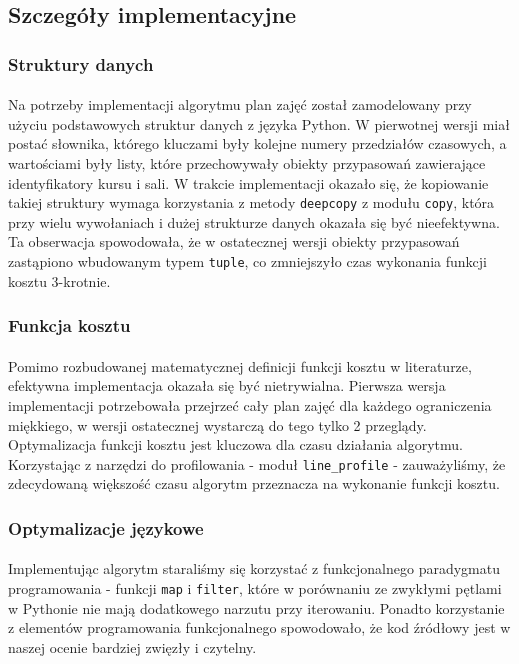 \subsection{Szczegóły implementacyjne}
\subsubsection{Struktury danych}
\paragraph{} Na potrzeby implementacji algorytmu plan zajęć został zamodelowany przy użyciu podstawowych struktur danych z języka Python. W pierwotnej wersji miał postać słownika, którego kluczami były kolejne numery przedziałów czasowych, a wartościami były listy, które przechowywały obiekty przypasowań zawierające identyfikatory kursu i sali. W trakcie implementacji okazało się, że kopiowanie takiej struktury wymaga korzystania z metody \verb#deepcopy# z modułu \verb#copy#, która przy wielu wywołaniach i dużej strukturze danych okazała się być nieefektywna. Ta obserwacja spowodowała, że w ostatecznej wersji obiekty przypasowań zastąpiono wbudowanym typem \verb#tuple#, co zmniejszyło czas wykonania funkcji kosztu 3-krotnie.
\subsubsection{Funkcja kosztu}
\paragraph{} Pomimo rozbudowanej matematycznej definicji funkcji kosztu w literaturze, efektywna implementacja okazała się być nietrywialna. Pierwsza wersja implementacji potrzebowała przejrzeć cały plan zajęć dla każdego ograniczenia miękkiego, w wersji ostatecznej wystarczą do tego tylko 2 przeglądy. Optymalizacja funkcji kosztu jest kluczowa dla czasu działania algorytmu. Korzystając z narzędzi do profilowania - moduł \verb#line_profile# - zauważyliśmy, że zdecydowaną większość czasu algorytm przeznacza na wykonanie funkcji kosztu.
\subsubsection{Optymalizacje językowe}
\paragraph{} Implementując algorytm staraliśmy się korzystać z funkcjonalnego paradygmatu programowania - funkcji \verb#map# i \verb#filter#, które w porównaniu ze zwykłymi pętlami w Pythonie nie mają dodatkowego narzutu przy iterowaniu. Ponadto korzystanie z elementów programowania funkcjonalnego spowodowało, że kod źródłowy jest w naszej ocenie bardziej zwięzły i czytelny.
